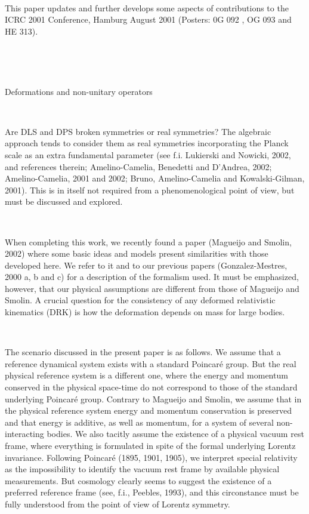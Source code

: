 \documentclass[a4paper,12pt,dvips]{article}
\makeatletter
\renewcommand{\section}{\@startsection{section}{1}{0in}
	{0.4\baselineskip}{0.1\baselineskip}{\Large\bf}}
\makeatother
\begin{document}
~ 

This paper updates and further develops some aspects
of contributions to the
ICRC 2001 Conference, Hamburg August 2001 (Posters: 0G 092 , OG 093 and HE 313).
~
%
~
\vspace{1ex}

~

%
%
~ 

\section{Deformations and non-unitary operators}
\label{relativity.sec}

~
~ 

Are DLS and DPS broken symmetries or real symmetries? The algebraic approach tends to consider them as real symmetries incorporating the Planck scale as an extra fundamental parameter (see f.i. Lukierski and Nowicki, 2002, and references therein; Amelino-Camelia, Benedetti and D'Andrea, 2002; Amelino-Camelia, 2001 and 2002; Bruno, Amelino-Camelia and Kowalski-Gilman, 2001). This is in itself not required from a phenomenological point of view, but must be discussed and explored.

~ 

When completing this work, we recently found a paper (Magueijo and Smolin, 2002) where some basic ideas and models present similarities with those developed here. We refer to it and to our previous papers (Gonzalez-Mestres, 2000 a, b and c) for a description of the formalism used. It must be emphasized, however, that our physical assumptions are different from those of Magueijo and Smolin. A crucial question for the consistency of any deformed relativistic kinematics (DRK) is how the deformation depends on mass for large bodies.

~ 

The scenario discussed in the present paper is as follows. We assume that a reference dynamical system exists with a standard Poincar\'e group. But the real physical reference system is a different one, where the energy and momentum conserved in the physical space-time do not correspond to those of the standard underlying Poincar\'e group. Contrary to Magueijo and Smolin, we assume that in the physical reference system energy and momentum conservation is preserved and that energy is additive, as well as momentum, for a system of several non-interacting bodies. We also tacitly assume the existence of a physical vacuum rest frame, where everything is formulated in spite of the formal underlying Lorentz invariance. Following Poincar\'e (1895, 1901, 1905), we interpret special relativity as the impossibility to identify the vacuum rest frame by available physical measurements. But cosmology clearly seems to suggest the existence of a preferred reference frame (see, f.i., Peebles, 1993), and this circonstance must be fully understood from the point of view of Lorentz symmetry.
\end{document}
